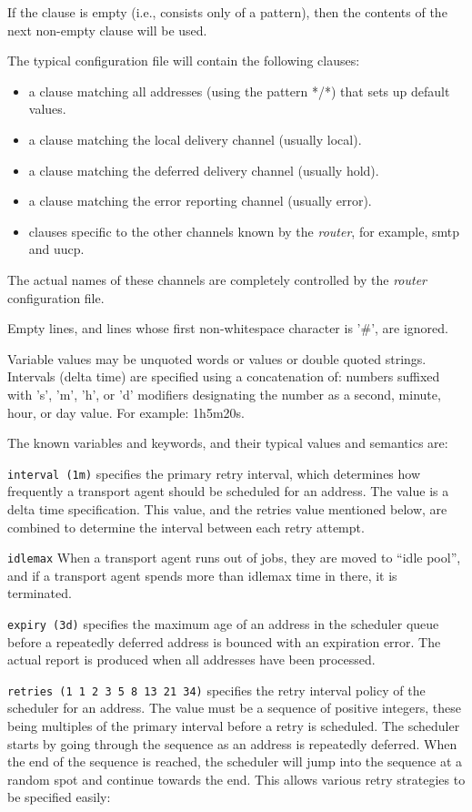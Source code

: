 If the clause is empty (i.e., consists only of a pattern),
then the contents of the next non-empty clause will be used.

The typical configuration file will contain the following clauses:
\begin{itemize}
\item a clause matching all addresses (using the pattern */*) that sets 
up default values.
\item a  clause  matching  the  local delivery channel
(usually local).
\item a clause matching the deferred    delivery  channel
(usually hold).
\item a  clause  matching  the error reporting channel
(usually error).
\item clauses specific to the other channels    known  by
the {\em router\/}, for example, smtp and uucp.
\end{itemize}


The  actual  names  of  these channels are completely 
controlled by the {\em router\/} configuration file.

Empty  lines,  and  lines   whose   first   non-whitespace
character is '\#', are ignored.

Variable values may be unquoted words or values or double 
quoted strings.  Intervals  (delta  time)  are  specified
using  a concatenation of: numbers suffixed with 's', 'm',
'h', or 'd' modifiers designating the number as a  second,
minute, hour, or day value.  For example: 1h5m20s.

The known variables and keywords, and their typical values
and semantics are:

{\tt interval (1m)}
specifies the primary retry interval, which determines how frequently a 
transport agent should be scheduled for an address. The value is a delta
time specification. This value, and the retries value mentioned below, 
are combined to determine the interval between each retry attempt.

{\tt idlemax}
When a transport agent runs out of jobs, they are moved
to ``idle pool'', and if a transport agent spends more than idlemax
time in there, it is terminated.

{\tt expiry (3d)}
specifies  the  maximum age of an address in the scheduler 
queue before  a repeatedly  deferred  address  is
bounced with an expiration error.  The actual report is
produced when all addresses have been processed.

{\tt retries (1 1 2 3 5 8 13 21 34)} 
specifies the retry interval policy  of the scheduler 
for an address. The value must be a sequence of positive integers, these 
being multiples of the primary interval  before  a  retry is scheduled. 
The scheduler starts by going through the sequence as an  address  is 
repeatedly deferred. When the end of the sequence is reached, the scheduler 
will jump into the sequence at a random  spot and continue towards the end.  
This allows various retry strategies to be specified easily:

